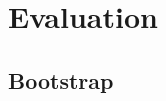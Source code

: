 \documentclass[a4paper,11pt]{kth-mag}
\begin{document}
  \chapter{Evaluation}
    \section{Bootstrap}
\end{document}

